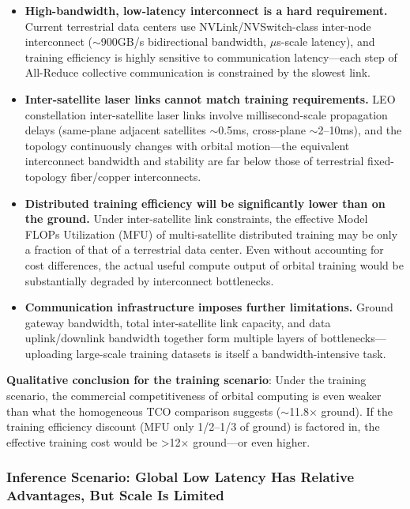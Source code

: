 \begin{itemize}[leftmargin=*]
    \item \textbf{High-bandwidth, low-latency interconnect is a hard requirement.} Current terrestrial data centers use NVLink/NVSwitch-class inter-node interconnect ($\sim$900\;GB/s bidirectional bandwidth, $\mu$s-scale latency), and training efficiency is highly sensitive to communication latency---each step of All-Reduce collective communication is constrained by the slowest link.
    \item \textbf{Inter-satellite laser links cannot match training requirements.} LEO constellation inter-satellite laser links involve millisecond-scale propagation delays (same-plane adjacent satellites $\sim$0.5\;ms, cross-plane $\sim$2--10\;ms), and the topology continuously changes with orbital motion---the equivalent interconnect bandwidth and stability are far below those of terrestrial fixed-topology fiber/copper interconnects.
    \item \textbf{Distributed training efficiency will be significantly lower than on the ground.} Under inter-satellite link constraints, the effective Model FLOPs Utilization (MFU) of multi-satellite distributed training may be only a fraction of that of a terrestrial data center. Even without accounting for cost differences, the actual useful compute output of orbital training would be substantially degraded by interconnect bottlenecks.
    \item \textbf{Communication infrastructure imposes further limitations.} Ground gateway bandwidth, total inter-satellite link capacity, and data uplink/downlink bandwidth together form multiple layers of bottlenecks---uploading large-scale training datasets is itself a bandwidth-intensive task.
\end{itemize}

\textbf{Qualitative conclusion for the training scenario}: Under the training scenario, the commercial competitiveness of orbital computing is even weaker than what the homogeneous TCO comparison suggests ($\sim$11.8$\times$ ground). If the training efficiency discount (MFU only 1/2--1/3 of ground) is factored in, the effective training cost would be >12$\times$ ground---or even higher.

\subsubsection{Inference Scenario: Global Low Latency Has Relative Advantages, But Scale Is Limited}

